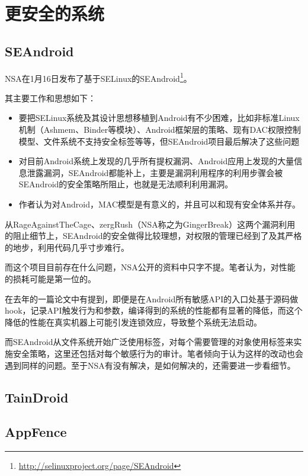 \section{更安全的系统}
\subsection{SEAndroid}
NSA在1月16日发布了基于SELinux的SEAndroid\footnote{\url{http://selinuxproject.org/page/SEAndroid}}。

其主要工作和思想如下：

\begin{itemize}
  \item 要把SELinux系统及其设计思想移植到Android有不少困难，比如非标准Linux机制（Ashmem、Binder等模块）、Android框架层的策略、现有DAC权限控制模型、文件系统不支持安全标签等等，但SEAndroid项目最后解决了这些问题
  \item 对目前Android系统上发现的几乎所有提权漏洞、Android应用上发现的大量信息泄露漏洞，SEAndroid都能补上，主要是漏洞利用程序的利用步骤会被SEAndroid的安全策略所阻止，也就是无法顺利利用漏洞。
  \item 作者认为对Android，MAC模型是有意义的，并且可以和现有安全体系并存。
\end{itemize}

从RageAgainstTheCage、zergRush（NSA称之为GingerBreak）这两个漏洞利用的阻止细节上，SEAndroid的安全做得比较理想，对权限的管理已经到了及其严格的地步，利用代码几乎寸步难行。

而这个项目目前存在什么问题，NSA公开的资料中只字不提。笔者认为，对性能的损耗可能是第一位的。

在去年的一篇论文中有提到，即便是在Android所有敏感API的入口处基于源码做hook，记录API触发行为和参数，编译得到的系统的性能都有显著的降低，而这个降低的性能在真实机器上可能引发连锁效应，导致整个系统无法启动。

而SEAndroid从文件系统开始广泛使用标签，对每个需要管理的对象使用标签来实施安全策略，这里还包括对每个敏感行为的审计。笔者倾向于认为这样的改动也会遇到同样的问题。至于NSA有没有解决，是如何解决的，还需要进一步看细节。

\subsection{TainDroid}

\subsection{AppFence}
